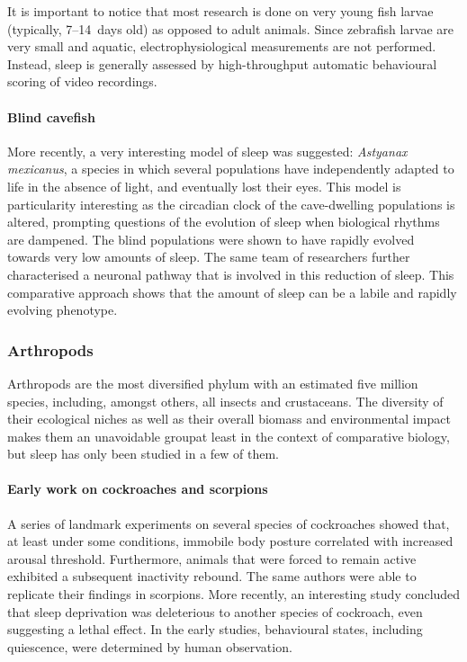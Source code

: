 It is important to notice that most research is done on very young fish larvae (typically, 7--14~days old) as opposed to adult animals.
Since zebrafish larvae are very small and aquatic, electrophysiological measurements are not performed.
Instead, sleep is generally assessed by high-throughput automatic behavioural scoring of video recordings.

\paragraph*{Blind cavefish}
More recently, a very interesting model of sleep was suggested: \emph{Astyanax mexicanus}, a species
in which several populations have independently adapted to life in the absence of light, and eventually lost their eyes\cite{duboue_evolutionary_2011,jaggard_hypocretin_2018}.
This model is particularity interesting as the circadian clock of the cave-dwelling populations is altered\cite{beale_circadian_2013}, prompting questions of the evolution of sleep when biological rhythms are dampened.
The blind populations were shown to have rapidly evolved towards very low amounts of sleep\cite{duboue_evolutionary_2011}. The same team of researchers further characterised a neuronal pathway that is involved in this reduction of sleep\cite{jaggard_hypocretin_2018}. 
This comparative approach shows that the amount of sleep can be a labile and rapidly evolving phenotype.

\subsubsection{Arthropods}

Arthropods are the most diversified phylum with an estimated five million species, including, amongst others, all insects and crustaceans\cite{odegaard_how_2000}. 
The diversity of their ecological niches as well as their overall biomass and environmental impact\cite{stork_abundance_1993,ganihar_biomass_1997} makes them an unavoidable group\emd{}at least in the context of comparative biology\emd, but sleep has only been studied in a few of them.

\paragraph*{Early work on cockroaches and scorpions}
A series of landmark experiments on several species of cockroaches showed that, at least under some conditions, immobile body posture correlated with increased arousal threshold\cite{tobler_effect_1983,tobler_24-h_1992}.
Furthermore, animals that were forced to remain active exhibited a subsequent inactivity rebound.
The same authors were able to replicate their findings in scorpions\cite{tobler_rest_1988}.
More recently, an interesting study concluded that sleep deprivation was deleterious to another species of cockroach, even suggesting a lethal effect\cite{stephenson_prolonged_2007}.
In the early studies, behavioural states, including quiescence, were determined by human observation. 

